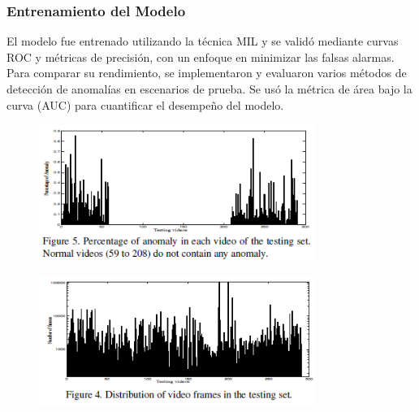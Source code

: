 \documentclass[listof=nochaptergap,12pt,times,authoryear]{report}
\begin{document}
\subsubsection{Entrenamiento del Modelo}
El modelo fue entrenado utilizando la técnica MIL y se validó mediante curvas ROC y métricas de precisión, con un enfoque en minimizar las falsas alarmas. Para comparar su rendimiento, se implementaron y evaluaron varios métodos de detección de anomalías en escenarios de prueba. Se usó la métrica de área bajo la curva (AUC) para cuantificar el desempeño del modelo.

\begin{figure}[h] %
    \centering
    \includegraphics[width=0.8\textwidth]{ent5.png} %
    \label{fig:ejemplo} %
\end{figure}

\begin{figure}[h] %
    \centering
    \includegraphics[width=0.8\textwidth]{ent5.1.png} %
    \label{fig:ejemplo} %
\end{figure}
\end{document}

